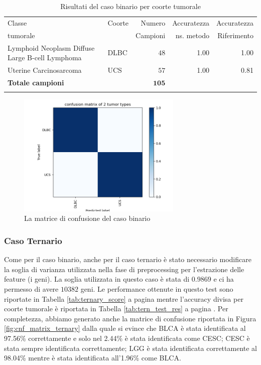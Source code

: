 \begin{table}[htbp!]
    \centering 
    \caption{Risultati del caso binario per coorte tumorale}
    \begin{tabular}{llrrr}
    \toprule
    Classe   & Coorte & Numero   & Accuratezza & Accuratezza \\
    tumorale &        & Campioni & ns. metodo  & Riferimento \\
    \midrule
    Lymphoid Neoplasm Diffuse Large B-cell Lymphoma & DLBC & $48$   & 1.00 & 1.00 \\
    Uterine Carcinosarcoma                          & UCS  & $57$   & 1.00 & 0.81 \\ 
    \midrule
    \textbf{Totale campioni}                        &      & $\mathbf{105}$  \\
    \bottomrule
    \label{tab:bin_test_res}
    \end{tabular} 
\end{table}

\begin{figure}
    \centering
    \includegraphics[width=0.7\textwidth]{images/cnfMatrices/cnf_matrix_caso_binario.png}
    \caption{La matrice di confusione del caso binario}
    \label{fig:cnf_matrix_binary}
\end{figure}

\subsubsection{Caso Ternario}
Come per il caso binario, anche per il caso ternario è stato necessario modificare la soglia di varianza utilizzata
nella fase di preprocessing per l'estrazione delle feature (i geni). La soglia utilizzata in questo caso è stata di
$0.9869$ e ci ha permesso di avere $10382$ geni. Le performance ottenute in questo test sono riportate in Tabella
\ref{tab:ternary_score} a pagina \pageref{tab:ternary_score} mentre l'accuracy divisa
per coorte tumorale è riportata in Tabella \ref{tab:tern_test_res} a pagina \pageref{tab:tern_test_res}. 
Per completezza, abbiamo generato anche la matrice di confusione riportata in Figura \ref{fig:cnf_matrix_ternary} 
dalla quale si evince che BLCA è stata identificata al 97.56\% correttamente e solo nel 2.44\% è stata 
identificata come CESC; CESC è stata sempre identificata correttamente; LGG è stata identificata correttamente al
98.04\% mentre è stata identificata all'1.96\% come BLCA. 

